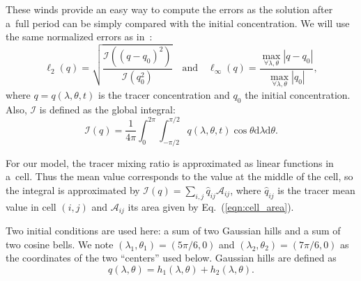   These winds provide an easy way to compute the errors as the
   solution after a~full period can be simply compared with the
   initial concentration. We will use the same normalized errors as
   in~\citet{Lauritzen2012}:
\begin{equation*}
  \ell_2(q) = \sqrt{\frac{\mathcal{I}((q-q_0)^2)}{\mathcal{I}(q_0^2)}}
  \quad \text{and} \quad
  \ell_{\infty}(q) = \frac{\displaystyle\max_{\forall\lambda, \theta}{|q - q_0|}}{\displaystyle\max_{\forall\lambda, \theta} |q_0|},
   \end{equation*}
   where $q=q(\lambda,\theta,t)$ is the tracer concentration and $q_0$
   the initial concentration.  Also, $\mathcal{I}$ is defined as the
   global integral:
\begin{equation*}
  \mathcal{I}(q) =
  \frac{1}{4\pi}\int_{0}^{2\pi}\int_{-\pi/2}^{\pi/2}{q(\lambda,\theta,t)\cos\theta
  \mathrm{d}\lambda \mathrm{d}\theta}.
    \end{equation*}

    For our model, the tracer mixing ratio is approximated as linear
    functions in a~cell. Thus the mean value corresponds to the
    value at the middle of the cell, so the integral is approximated
    by $\mathcal{I}(q) = \sum_{i,j}{\widehat{q}_{ij}} \mathcal{A}_{ij}$, where
    $\widehat{q}_{ij}$ is the tracer mean value in cell $(i,j)$ and
    $\mathcal{A}_{ij}$ its area given by Eq.~(\ref{eqn:cell_area}).

Two initial conditions are used here: a sum of two Gaussian hills and a sum of two cosine bells.
We note $(\lambda_1,\theta_1)=(5\pi/6,0)$ and
$(\lambda_2,\theta_2)=(7\pi/6,0)$ as the coordinates of the two ``centers'' used
below. Gaussian hills are defined as
\begin{equation*}
  q(\lambda, \theta) = h_1(\lambda, \theta) + h_2(\lambda, \theta).
\end{equation*}

